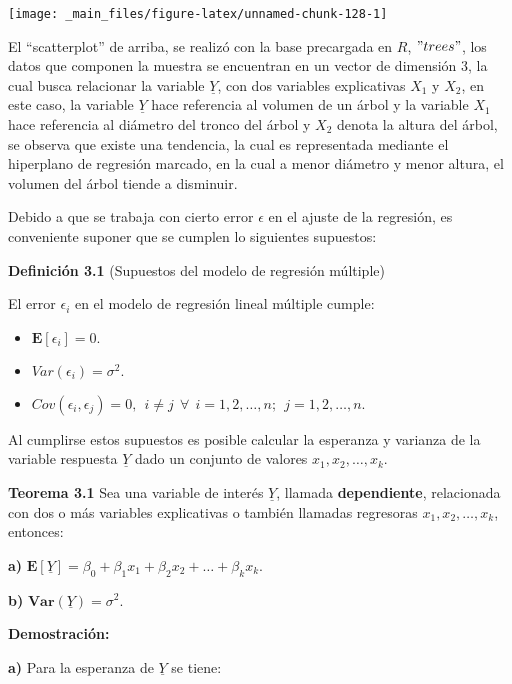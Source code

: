 \documentclass[
  a4paper,
  oneside,
  openany]{book}
\begin{document}
\begin{center}\texttt{[image: \_main\_files/figure-latex/unnamed-chunk-128-1]} \end{center}

El ``scatterplot'' de arriba, se realizó con la base precargada en \(R\), \("trees"\), los datos que componen la muestra se encuentran en un vector de dimensión 3, la cual busca relacionar la variable \(\underline{Y}\), con dos variables explicativas \(X_{1}\) y \(X_{2}\), en este caso, la variable \(\underline{Y}\) hace referencia al volumen de un árbol y la variable \(X_{1}\) hace referencia al diámetro del tronco del árbol y \(X_{2}\) denota la altura del árbol, se observa que existe una tendencia, la cual es representada mediante el hiperplano de regresión marcado, en la cual a menor diámetro y menor altura, el volumen del árbol tiende a disminuir.

Debido a que se trabaja con cierto error \(\epsilon\) en el ajuste de la regresión, es conveniente suponer que se cumplen lo siguientes supuestos:

\textbf{Definición 3.1} (Supuestos del modelo de regresión múltiple)

El error \(\epsilon_{i}\) en el modelo de regresión lineal múltiple cumple:

\begin{itemize}
\item
  \(\mathbf{E}[\epsilon_{i}]=0.\)
\item
  \(Var(\epsilon_{i})=\sigma^2.\)
\item
  \(Cov(\epsilon_{i},\epsilon_{j})=0, \ \ i \neq j \ \ \forall \ \ i= 1,2,\ldots,n; \ \ j= 1,2,\ldots,n.\)
\end{itemize}

Al cumplirse estos supuestos es posible calcular la esperanza y varianza de la variable respuesta \(\underline{Y}\) dado un conjunto de valores \(x_{1},x_{2},\ldots,x_{k}.\)

\textbf{Teorema 3.1} Sea una variable de interés \(\underline{Y}\), llamada \textbf{dependiente}, relacionada con dos o más variables explicativas o también llamadas regresoras \(x_{1},x_{2},\ldots,x_{k}\),
entonces:

\textbf{a)} \(\mathbf{E}[\underline{Y}]= \beta_{0}+\beta_{1}x_{1}+\beta_{2}x_{2}+ \ldots + \beta_{k}x_{k}.\)

\textbf{b)} \(\textbf{Var}(\underline{Y})= \sigma^2.\)

\textbf{Demostración:}

\textbf{a)} Para la esperanza de \(\underline{Y}\) se tiene:
\end{document}
